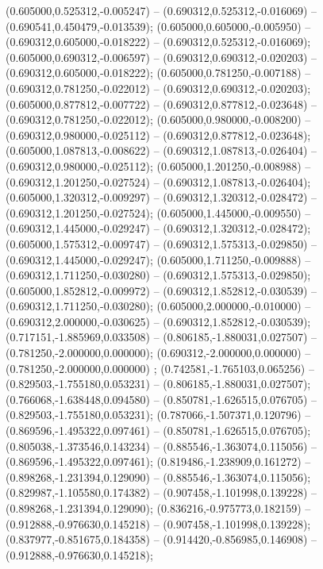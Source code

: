  (0.605000,0.525312,-0.005247) -- (0.690312,0.525312,-0.016069) -- (0.690541,0.450479,-0.013539);
 (0.605000,0.605000,-0.005950) -- (0.690312,0.605000,-0.018222) -- (0.690312,0.525312,-0.016069);
 (0.605000,0.690312,-0.006597) -- (0.690312,0.690312,-0.020203) -- (0.690312,0.605000,-0.018222);
 (0.605000,0.781250,-0.007188) -- (0.690312,0.781250,-0.022012) -- (0.690312,0.690312,-0.020203);
 (0.605000,0.877812,-0.007722) -- (0.690312,0.877812,-0.023648) -- (0.690312,0.781250,-0.022012);
 (0.605000,0.980000,-0.008200) -- (0.690312,0.980000,-0.025112) -- (0.690312,0.877812,-0.023648);
 (0.605000,1.087813,-0.008622) -- (0.690312,1.087813,-0.026404) -- (0.690312,0.980000,-0.025112);
 (0.605000,1.201250,-0.008988) -- (0.690312,1.201250,-0.027524) -- (0.690312,1.087813,-0.026404);
 (0.605000,1.320312,-0.009297) -- (0.690312,1.320312,-0.028472) -- (0.690312,1.201250,-0.027524);
 (0.605000,1.445000,-0.009550) -- (0.690312,1.445000,-0.029247) -- (0.690312,1.320312,-0.028472);
 (0.605000,1.575312,-0.009747) -- (0.690312,1.575313,-0.029850) -- (0.690312,1.445000,-0.029247);
 (0.605000,1.711250,-0.009888) -- (0.690312,1.711250,-0.030280) -- (0.690312,1.575313,-0.029850);
 (0.605000,1.852812,-0.009972) -- (0.690312,1.852812,-0.030539) -- (0.690312,1.711250,-0.030280);
 (0.605000,2.000000,-0.010000) -- (0.690312,2.000000,-0.030625) -- (0.690312,1.852812,-0.030539);
 (0.717151,-1.885969,0.033508) -- (0.806185,-1.880031,0.027507) -- (0.781250,-2.000000,0.000000);
 (0.690312,-2.000000,0.000000) -- (0.781250,-2.000000,0.000000) ;
 (0.742581,-1.765103,0.065256) -- (0.829503,-1.755180,0.053231) -- (0.806185,-1.880031,0.027507);
 (0.766068,-1.638448,0.094580) -- (0.850781,-1.626515,0.076705) -- (0.829503,-1.755180,0.053231);
 (0.787066,-1.507371,0.120796) -- (0.869596,-1.495322,0.097461) -- (0.850781,-1.626515,0.076705);
 (0.805038,-1.373546,0.143234) -- (0.885546,-1.363074,0.115056) -- (0.869596,-1.495322,0.097461);
 (0.819486,-1.238909,0.161272) -- (0.898268,-1.231394,0.129090) -- (0.885546,-1.363074,0.115056);
 (0.829987,-1.105580,0.174382) -- (0.907458,-1.101998,0.139228) -- (0.898268,-1.231394,0.129090);
 (0.836216,-0.975773,0.182159) -- (0.912888,-0.976630,0.145218) -- (0.907458,-1.101998,0.139228);
 (0.837977,-0.851675,0.184358) -- (0.914420,-0.856985,0.146908) -- (0.912888,-0.976630,0.145218);
